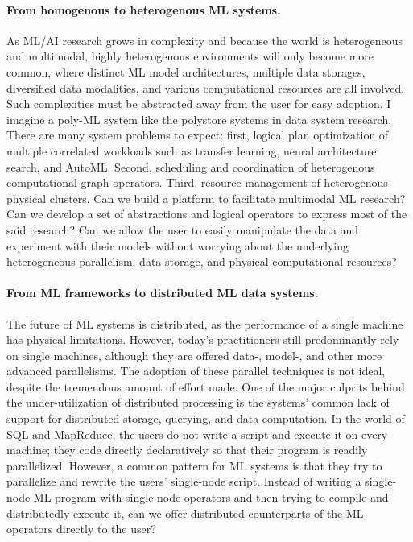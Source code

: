 \documentclass[letterpaper]{article}
\begin{document}
\paragraph{From homogenous to heterogenous ML systems.} As ML/AI research grows in complexity and because the world is heterogeneous and multimodal, highly heterogenous environments will only become more common, where distinct ML model architectures, multiple data storages, diversified data modalities, and various computational resources are all involved. Such complexities must be abstracted away from the user for easy adoption. I imagine a poly-ML system like the polystore systems in data system research. There are many system problems to expect: first, logical plan optimization of multiple correlated workloads such as transfer learning, neural architecture search, and AutoML. Second, scheduling and coordination of heterogenous computational graph operators. Third, resource management of heterogenous physical clusters. Can we build a platform to facilitate multimodal ML research? Can we develop a set of abstractions and logical operators to express most of the said research? Can we allow the user to easily manipulate the data and experiment with their models without worrying about the underlying heterogeneous parallelism, data storage, and physical computational resources? 

\paragraph{From ML frameworks to distributed ML data systems.} The future of ML systems is distributed, as the performance of a single machine has physical limitations. However, today's practitioners still predominantly rely on single machines, although they are offered data-, model-, and other more advanced parallelisms. The adoption of these parallel techniques is not ideal, despite the tremendous amount of effort made. One of the major culprits behind the under-utilization of distributed processing is the systems' common lack of support for distributed storage, querying, and data computation. In the world of SQL and MapReduce, the users do not write a script and execute it on every machine; they code directly declaratively so that their program is readily parallelized. However, a common pattern for ML systems is that they try to parallelize and rewrite the users' single-node script. Instead of writing a single-node ML program with single-node operators and then trying to compile and distributedly execute it, can we offer distributed counterparts of the ML operators directly to the user?
\end{document}
